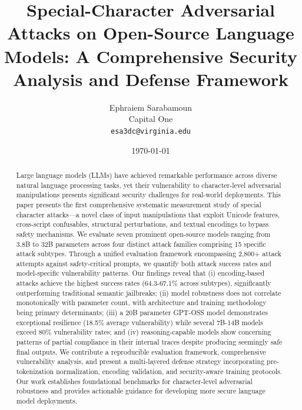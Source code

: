 \documentclass[11pt]{article}
\title{Special-Character Adversarial Attacks on Open-Source Language Models: A Comprehensive Security Analysis and Defense Framework}
\author{Ephraiem Sarabamoun\\Capital One\\\texttt{esa3dc@virginia.edu}}
\date{\today}
\begin{document}
\maketitle

\begin{abstract}
Large language models (LLMs) have achieved remarkable performance across diverse natural language processing tasks, yet their vulnerability to character-level adversarial manipulations presents significant security challenges for real-world deployments. This paper presents the first comprehensive systematic measurement study of special character attacks—a novel class of input manipulations that exploit Unicode features, cross-script confusables, structural perturbations, and textual encodings to bypass safety mechanisms. We evaluate seven prominent open-source models ranging from 3.8B to 32B parameters across four distinct attack families comprising 15 specific attack subtypes. Through a unified evaluation framework encompassing 2,800+ attack attempts against safety-critical prompts, we quantify both attack success rates and model-specific vulnerability patterns. Our findings reveal that (i) encoding-based attacks achieve the highest success rates (64.3-67.1\% across subtypes), significantly outperforming traditional semantic jailbreaks; (ii) model robustness does not correlate monotonically with parameter count, with architecture and training methodology being primary determinants; (iii) a 20B parameter GPT-OSS model demonstrates exceptional resilience (18.5\% average vulnerability) while several 7B-14B models exceed 80\% vulnerability rates; and (iv) reasoning-capable models show concerning patterns of partial compliance in their internal traces despite producing seemingly safe final outputs. We contribute a reproducible evaluation framework, comprehensive vulnerability analysis, and present a multi-layered defense strategy incorporating pre-tokenization normalization, encoding validation, and security-aware training protocols. Our work establishes foundational benchmarks for character-level adversarial robustness and provides actionable guidance for developing more secure language model deployments.
\end{abstract}
\end{document}
